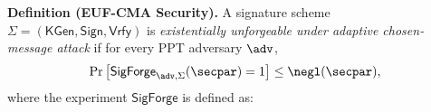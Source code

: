 \textbf{Definition (EUF-CMA Security).}
A signature scheme $\Sigma = (\mathsf{KGen}, \mathsf{Sign}, \mathsf{Vrfy})$ is
\emph{existentially unforgeable under adaptive chosen-message attack} if for
every PPT adversary $\adv$,
\[
\Pr\left[ \mathsf{SigForge}_{\adv,\Sigma}(\secpar) = 1 \right] \le \negl(\secpar),
\]
where the experiment $\mathsf{SigForge}$ is defined as:

\medskip
\begin{center}
\end{center}
